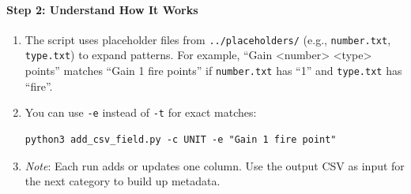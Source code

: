 \paragraph{Step 2: Understand How It Works}
\begin{enumerate}
	\item The script uses placeholder files from \texttt{../placeholders/} (e.g., \texttt{number.txt}, \texttt{type.txt}) to expand patterns. For example, ``Gain <number> <type> points'' matches ``Gain 1 fire points'' if \texttt{number.txt} has ``1'' and \texttt{type.txt} has ``fire''.
	\item You can use \texttt{-e} instead of \texttt{-t} for exact matches:
\begin{lstlisting}[style=terminalstyle]
python3 add_csv_field.py -c UNIT -e "Gain 1 fire point"
\end{lstlisting}
	\item[] \textit{Note}: Each run adds or updates one column. Use the output CSV as input for the next category to build up metadata.
\end{enumerate}

